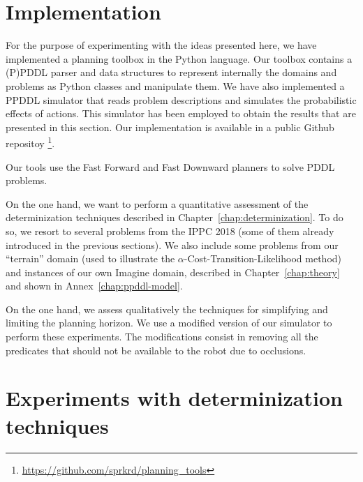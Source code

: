\documentclass[../root.tex]{subfiles}
\begin{document}
\section{Implementation}

For the purpose of experimenting with the ideas presented here, we have implemented
a planning toolbox in the Python language. Our toolbox contains a (P)PDDL parser and
data structures to represent internally the domains and problems as Python classes
and manipulate them. We have also implemented a PPDDL simulator that reads problem
descriptions and simulates the probabilistic effects of actions. This simulator
has been employed to obtain the results that are presented in this section.
Our implementation is available in a public Github repositoy%
\footnote{\url{https://github.com/sprkrd/planning_tools}}.

Our tools use the Fast Forward and Fast Downward planners to solve PDDL problems.

On the one hand, we want to perform a quantitative assessment of the
determinization techniques described in Chapter~\ref{chap:determinization}. 
To do so, we resort to several problems from the IPPC 2018 (some of them already
introduced in the previous sections).
We also include some problems from our ``terrain'' domain (used to illustrate
the $\alpha$-Cost-Transition-Likelihood method) and instances of our own Imagine
domain, described in Chapter~\ref{chap:theory} and shown in Annex~\ref{chap:ppddl-model}.

On the one hand, we assess qualitatively the techniques for simplifying and limiting
the planning horizon. We use a modified version of our simulator to perform these
experiments. The modifications consist in removing all the predicates that should not
be available to the robot due to occlusions.

\section{Experiments with determinization techniques}
\end{document}
